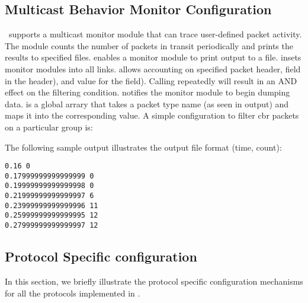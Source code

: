 \subsection{Multicast Behavior Monitor Configuration}
\ns\ supports a multicast monitor module that can trace
user-defined packet activity.
The module counts the number of packets in transit periodically
and prints the results to specified files.  enables a 
monitor module to print output to a file. 
 insets monitor modules into all links. 
 allows accounting on specified packet header, 
field in the header), and value for the field).  Calling 
repeatedly will result in an AND effect on the filtering condition.
 notifies the monitor module to begin dumping data.
 is a global arrary that takes a packet type name (as seen in
 output) and maps it into the corresponding value.  
A simple configuration to filter cbr packets on a particular group is:


The following sample output illustrates the output file format (time, count):
{\small
\begin{verbatim}
0.16 0
0.17999999999999999 0
0.19999999999999998 0
0.21999999999999997 6
0.23999999999999996 11
0.25999999999999995 12
0.27999999999999997 12
\end{verbatim}
}

\subsection{Protocol Specific configuration}

In this section, we briefly illustrate the
protocol specific configuration mechanisms
for all the protocols implemented in \ns.

